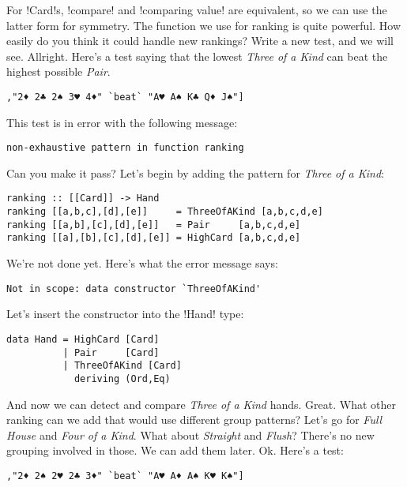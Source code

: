 \success For \il!Card!s, \il!compare! and \il!comparing value! are equivalent, so we can use the latter form for symmetry.
\lhN The function we use for ranking is quite powerful. How easily do you think it could handle new rankings?
\lhA Write a new test, and we will see.
\lhN Allright. Here's a test saying that the lowest \emph{Three of a Kind} can beat the highest possible \emph{Pair}.
\begin{lstlisting}[frame=single]
       ,"2♦ 2♣ 2♠ 3♥ 4♦" `beat` "A♥ A♠ K♣ Q♦ J♠"]
\end{lstlisting}
This test is in error with the following message: \\
\begin{small}
\begin{verbatim}
non-exhaustive pattern in function ranking
\end{verbatim}
\end{small}
Can you make it pass?
\hspace*{\fill}
\lhA \error Let's begin by adding the pattern for \emph{Three of a Kind}:
\begin{lstlisting}[frame=single]
ranking :: [[Card]] -> Hand
ranking [[a,b,c],[d],[e]]     = ThreeOfAKind [a,b,c,d,e]
ranking [[a,b],[c],[d],[e]]   = Pair     [a,b,c,d,e]
ranking [[a],[b],[c],[d],[e]] = HighCard [a,b,c,d,e] 
\end{lstlisting}
\error We're not done yet.
\lhN Here's what the error message says: \\
\begin{small}
\begin{verbatim}
Not in scope: data constructor `ThreeOfAKind'
\end{verbatim}
\end{small}
\hspace*{\fill}
\lhA Let's insert the constructor into the \il!Hand! type:
\begin{lstlisting}[frame=single]
data Hand = HighCard [Card]
          | Pair     [Card]
          | ThreeOfAKind [Card]
            deriving (Ord,Eq)
\end{lstlisting}
\success And now we can detect and compare \emph{Three of a Kind} hands. 
\lhN Great. What other ranking can we add that would use different group patterns?
\lhA Let's go for \emph{Full House} and \emph{Four of a Kind}.
\lhN What about \emph{Straight} and \emph{Flush}?
\lhA There's no new grouping involved in those. We can add them later.
\lhN Ok. Here's a test:
\begin{lstlisting}[frame=single]
       ,"2♦ 2♠ 2♥ 2♣ 3♦" `beat` "A♥ A♦ A♠ K♥ K♠"]
\end{lstlisting}
